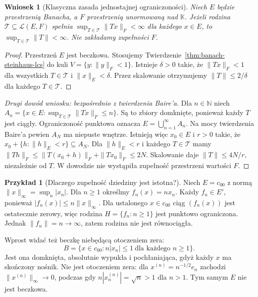 \documentclass[11pt,a4paper]{article}
\numberwithin{equation}{section}
\theoremstyle{plain}
\newtheorem{wniosek}[twierdzenie]{Wniosek}
\theoremstyle{definition}
\newtheorem{przyklad}[twierdzenie]{Przykład}
\theoremstyle{remark}
\newcommand{\N}{\mathbb N}
\newcommand{\K}{\mathbb K}
\begin{document}
\begin{wniosek}[Klasyczna zasada jednostajnej ograniczoności]
\label{cor:uniform-boundedness}
Niech $E$ będzie przestrzenią Banacha, a $F$ przestrzenią
unormowaną nad $\K$. Jeżeli rodzina
$\mathcal T\subseteq\mathcal L(E,F)$ spełnia
$\sup_{T\in\mathcal T}\|Tx\|_F<\infty$ dla każdego
$x\in E$, to $\sup_{T\in\mathcal T}\|T\|<\infty$.
Nie zakładamy zupełności $F$.
\end{wniosek}
\begin{proof}
Przestrzeń $E$ jest beczkowa. Stosujemy
Twierdzenie~\ref{thm:banach-steinhaus-lcs} do kuli
$V=\{y:\|y\|_F<1\}$. Istnieje $\delta>0$ takie, że
$\|Tx\|_F<1$ dla wszystkich $T\in\mathcal T$
i $\|x\|_E<\delta$. Przez skalowanie otrzymujemy
$\|T\|\le 2/\delta$ dla każdego $T\in\mathcal T$.
\end{proof}

\begin{proof}[Drugi dowód wniosku: bezpośrednio z twierdzenia Baire'a]
Dla $n\in\N$ niech
$A_n=\{x\in E:\sup_{T\in\mathcal T}\|Tx\|_F\le n\}$.
Są to zbiory domknięte, ponieważ każdy $T$ jest ciągły.
Ograniczoność punktowa oznacza
$E=\bigcup_{n=1}^\infty A_n$. Na mocy twierdzenia Baire'a
pewien $A_N$ ma niepuste wnętrze. Istnieją więc
$x_0\in E$ i $r>0$ takie, że
$x_0+\{h:\|h\|_E<r\}\subseteq A_N$.
Dla $\|h\|_E<r$ i każdego $T\in\mathcal T$ mamy
$\|Th\|_F\le\|T(x_0+h)\|_F+\|Tx_0\|_F\le2N$.
Skalowanie daje $\|T\|\le4N/r$, niezależnie od $T$.
W dowodzie nie wystąpiła zupełność przestrzeni wartości $F$.
\end{proof}

\begin{przyklad}[Dlaczego zupełność dziedziny jest istotna?]
\label{ex:c00-not-barrelled}
Niech $E=c_{00}$ z normą $\|x\|_\infty=\sup_n|x_n|$.
Dla $n\ge1$ określmy $f_n(x)=nx_n$. Każdy $f_n\in E'$,
ponieważ $|f_n(x)|\le n\|x\|_\infty$.
Dla ustalonego $x\in c_{00}$ ciąg $(f_n(x))$ jest
ostatecznie zerowy, więc rodzina $H=\{f_n:n\ge1\}$ jest
punktowo ograniczona. Jednak $\|f_n\|=n\to\infty$,
zatem rodzina nie jest równociągła.

Wprost widać też beczkę niebędącą otoczeniem zera:
\[
 B=\{x\in c_{00}: n|x_n|\le1\ \text{dla każdego }n\ge1\}.
\]
Jest ona domknięta, absolutnie wypukła i pochłaniająca,
gdyż każdy $x$ ma skończony nośnik. Nie jest otoczeniem
zera: dla $x^{(n)}=n^{-1/2}e_n$ zachodzi
$\|x^{(n)}\|_\infty\to0$, podczas gdy
$n|x_n^{(n)}|=\sqrt n>1$ dla $n>1$. Tym samym
$E$ nie jest beczkowa.
\end{przyklad}
\end{document}
